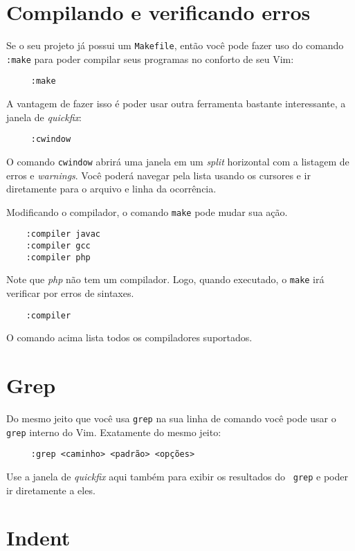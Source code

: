 \section{Compilando e verificando erros}
Se o seu projeto já possui um {\tt Makefile}, então você pode fazer uso do comando
{\tt :make} para poder compilar seus programas no conforto de seu Vim:

\begin{verbatim}
     :make
\end{verbatim}

A vantagem de fazer isso é poder usar outra ferramenta bastante interessante, a janela
de {\em quickfix}:

\begin{verbatim}
     :cwindow
\end{verbatim}

O comando {\tt cwindow} abrirá uma janela em um {\em split} horizontal com a
listagem de erros e {\em warnings}.  Você poderá navegar pela lista usando os
cursores e ir diretamente para o arquivo e linha da ocorrência.

Modificando o compilador, o comando {\tt make} pode mudar sua ação.

\begin{verbatim}
	:compiler javac
	:compiler gcc
	:compiler php
\end{verbatim}

Note que {\em php} não tem um compilador. Logo, quando executado, o {\tt make} irá verificar
por erros de sintaxes.

\begin{verbatim}
	:compiler
\end{verbatim}

O comando acima lista todos os compiladores suportados.

\section{Grep}

Do mesmo jeito que você usa {\tt grep} na sua linha de comando você pode usar
o {\tt grep} interno do Vim. Exatamente do mesmo jeito:

\begin{verbatim}
     :grep <caminho> <padrão> <opções>
\end{verbatim}

Use a janela de {\em quickfix} aqui também para exibir os resultados do {\tt
grep} e poder ir diretamente a eles.

\section{Indent}

